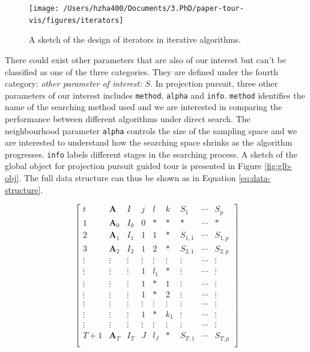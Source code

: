 \documentclass[12pt]{article}
\begin{document}
\begin{figure}
\texttt{[image: /Users/hzha400/Documents/3.PhD/paper-tour-vis/figures/iterators]} \caption{\label{iterators} A sketch of the design of iterators in iterative algorithms.}\label{fig:iterators}
\end{figure}

There could exist other parameters that are also of our interest but
can't be classified as one of the three categories. They are defined
under the fourth category: \emph{other parameter of interest: \(S\)}. In
projection pursuit, three other parameters of our interest includes
\texttt{method}, \texttt{alpha} and \texttt{info}. \texttt{method}
identifies the name of the searching method used and we are interested
in comparing the performance between different algorithms under direct
search. The neighbourhood parameter \texttt{alpha} controls the size of
the sampling space and we are interested to understand how the searching
space shrinks as the algorithm progresses. \texttt{info} labels
different stages in the searching process. A sketch of the global object
for projection pursuit guided tour is presented in Figure
\ref{fig:glb-obj}. The full data structure can thus be shown as in
Equation \ref{eq:data-structure}.

\begin{equation}
\left[
\begin{array}{c|cc|ccc|ccc}
t & \mathbf{A} & I & j &  l  & k & S_{1}& \cdots & S_{p}\\
\hline
1 & \mathbf{A}_0 & I_0 & 0 & \ast & \ast & \ast & \cdots & \ast\\
\hline
2 & \mathbf{A}_1 & I_1 & 1 & 1 & \ast & S_{1, 1} & \cdots & S_{1, p}\\
3 & \mathbf{A}_2 & I_2 & 1 & 2 & \ast & S_{2, 1} & \cdots & S_{2, p}\\
\vdots & \vdots &\vdots & \vdots &\vdots & \vdots &\vdots &\cdots &\vdots\\
\vdots & \vdots & \vdots & 1 & l_1 & \ast & \vdots &  \cdots & \vdots\\
\hline
\vdots &\vdots & \vdots & 1 & \ast & 1& \vdots &  \cdots & \vdots\\
\vdots &\vdots &\vdots& 1 & \ast & 2& \vdots& \cdots & \vdots\\
\vdots &\vdots &\vdots &\vdots  &\vdots & \vdots &\vdots &\cdots &\vdots \\
\vdots &\vdots &\vdots & 1 & \ast & k_1&\vdots & \cdots & \vdots\\
\hline
\vdots &\vdots &\vdots &\vdots  &\vdots & \vdots &\vdots &\cdots &\vdots \\
T+1 & \mathbf{A}_T & I_T & J &  l_J & \ast & S_{T, 1}& \cdots & S_{T, p}\\
\end{array}
\right]
\label{eq:data-structure}
\end{equation}
\end{document}
